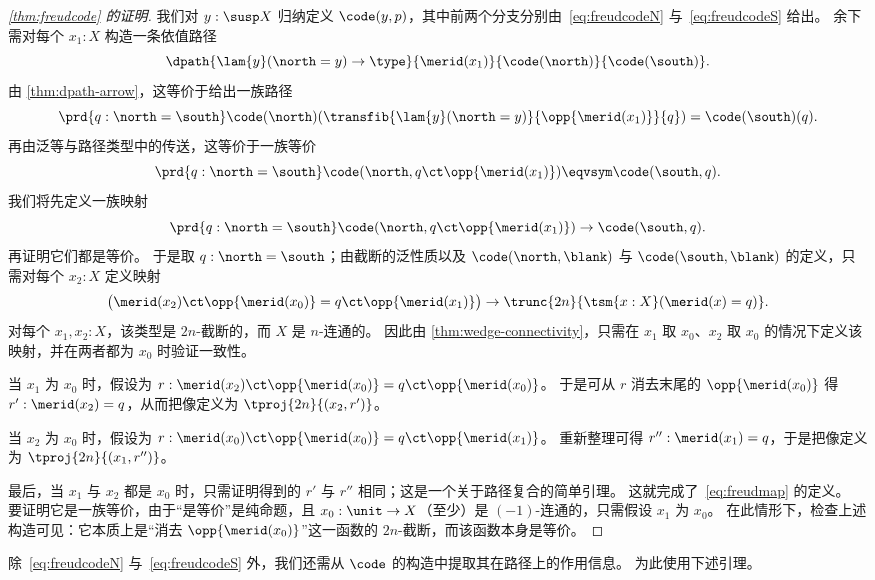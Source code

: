 \begin{proof}[\cref{thm:freudcode} 的证明]
  我们对 $y:\susp X$ 归纳定义 $\code(y,p)$，其中前两个分支分别由~\eqref{eq:freudcodeN} 与~\eqref{eq:freudcodeS} 给出。
  余下需对每个 $x_1:X$ 构造一条依值路径
  \[ \dpath{\lam{y}(\north=y)\to\type}{\merid(x_1)}{\code(\north)}{\code(\south)}. \]
  由 \cref{thm:dpath-arrow}，这等价于给出一族路径
  \[ \prd{q:\north=\south} \code(\north)(\transfib{\lam{y}(\north=y)}{\opp{\merid(x_1)}}{q}) = \code(\south)(q). \]
  再由泛等与路径类型中的传送，这等价于一族等价
  \[ \prd{q:\north=\south} \code(\north,q \ct \opp{\merid(x_1)}) \eqvsym \code(\south,q). \]
  我们将先定义一族映射
  \begin{equation}\label{eq:freudmap}
    \prd{q:\north=\south} \code(\north,q \ct \opp{\merid(x_1)}) \to \code(\south,q).
  \end{equation}
  再证明它们都是等价。
  于是取 $q:\north=\south$；由截断的泛性质以及 $\code(\north,\blank)$ 与 $\code(\south,\blank)$ 的定义，只需对每个 $x_2:X$ 定义映射
  \begin{equation*}
    \big(\merid(x_2)\ct \opp{\merid(x_0)} = q \ct \opp{\merid(x_1)}\big)
    \to \trunc{2n}{\tsm{x:X} (\merid(x) = q)}.
  \end{equation*}
  对每个 $x_1,x_2:X$，该类型是 $2n$-截断的，而 $X$ 是 $n$-连通的。
  因此由 \cref{thm:wedge-connectivity}，只需在 $x_1$ 取 $x_0$、$x_2$ 取 $x_0$ 的情况下定义该映射，并在两者都为 $x_0$ 时验证一致性。

  当 $x_1$ 为 $x_0$ 时，假设为 $r:\merid(x_2)\ct \opp{\merid(x_0)} = q \ct \opp{\merid(x_0)}$。
  于是可从 $r$ 消去末尾的 $\opp{\merid(x_0)}$ 得 $r':\merid(x_2)=q$，从而把像定义为 $\tproj{2n}{(x_2,r')}$。

  当 $x_2$ 为 $x_0$ 时，假设为 $r:\merid(x_0)\ct \opp{\merid(x_0)} = q \ct \opp{\merid(x_1)}$。
  重新整理可得 $r'':\merid(x_1)=q$，于是把像定义为 $\tproj{2n}{(x_1,r'')}$。

  最后，当 $x_1$ 与 $x_2$ 都是 $x_0$ 时，只需证明得到的 $r'$ 与 $r''$ 相同；这是一个关于路径复合的简单引理。
  这就完成了~\eqref{eq:freudmap} 的定义。
  要证明它是一族等价，由于“是等价”是纯命题，且 $x_0:\unit\to X$（至少）是 $(-1)$-连通的，只需假设 $x_1$ 为 $x_0$。
  在此情形下，检查上述构造可见：它本质上是“消去 $\opp{\merid(x_0)}$”这一函数的 $2n$-截断，而该函数本身是等价。
\end{proof}

除~\eqref{eq:freudcodeN} 与~\eqref{eq:freudcodeS} 外，我们还需从 $\code$ 的构造中提取其在路径上的作用信息。
为此使用下述引理。

